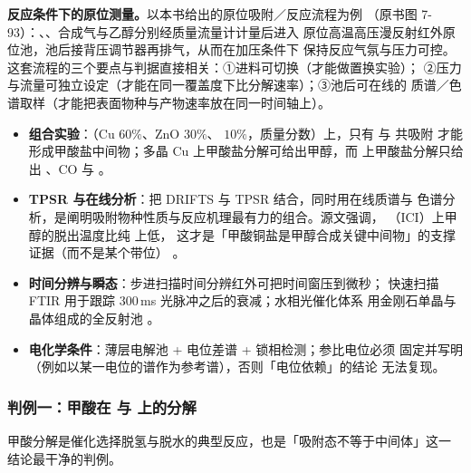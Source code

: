 \begin{measure}
\textbf{反应条件下的原位测量。}以本书给出的原位吸附／反应流程为例
（原书图 7-93）：、、合成气与乙醇分别经质量流量计计量后进入
原位高温高压漫反射红外原位池，池后接背压调节器再排气，从而在加压条件下
保持反应气氛与压力可控。
这套流程的三个要点与判据直接相关：①进料可切换（才能做置换实验）；
②压力与流量可独立设定（才能在同一覆盖度下比分解速率）；③池后可在线的
质谱／色谱取样（才能把表面物种与产物速率放在同一时间轴上）。
\begin{itemize}
  \item \textbf{组合实验}：（Cu $60\%$、ZnO $30\%$、
         $10\%$，质量分数）上，只有  与  共吸附
        才能形成甲酸盐中间物；多晶 Cu 上甲酸盐分解可给出甲醇，而 
        上甲酸盐分解只给出 、CO 与 
        。
  \item \textbf{TPSR 与在线分析}：把 DRIFTS 与 TPSR 结合，同时用在线质谱与
        色谱分析，是阐明吸附物种性质与反应机理最有力的组合。源文强调，
        （ICI）上甲醇的脱出温度比纯  上低，
        这才是「甲酸铜盐是甲醇合成关键中间物」的支撑证据（而不是某个带位）
        。
  \item \textbf{时间分辨与瞬态}：步进扫描时间分辨红外可把时间窗压到微秒；
        快速扫描 FTIR 用于跟踪 $300$\,ms 光脉冲之后的衰减；水相光催化体系
        用金刚石单晶与  晶体组成的全反射池
        。
  \item \textbf{电化学条件}：薄层电解池 + 电位差谱 + 锁相检测；参比电位必须
        固定并写明（例如以某一电位的谱作为参考谱），否则「电位依赖」的结论
        无法复现。
\end{itemize}
\end{measure}

\subsubsection{判例一：甲酸在  与  上的分解}

甲酸分解是催化选择脱氢与脱水的典型反应，也是「吸附态不等于中间体」这一
结论最干净的判例。


